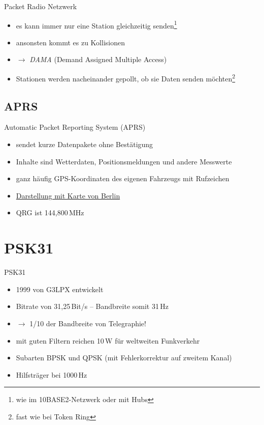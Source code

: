 \begin{frame}{Packet Radio Netzwerk}
  \begin{itemize}
    \item es kann immer nur eine Station gleichzeitig senden\footnote{wie im 10BASE2-Netzwerk oder mit Hubs}
    \item ansonsten kommt es zu Kollisionen
    \item $\rightarrow$ \emph{DAMA} (Demand Assigned Multiple Access)
    \item Stationen werden nacheinander gepollt, ob sie Daten senden möchten\footnote{fast wie bei Token Ring}
  \end{itemize}
\end{frame}

\subsection{APRS}
\begin{frame}{Automatic Packet Reporting System (APRS)}
  \begin{itemize}
    \item sendet kurze Datenpakete ohne Bestätigung
    \item Inhalte sind Wetterdaten, Positionsmeldungen und andere Messwerte
    \item ganz häufig GPS-Koordinaten des eigenen Fahrzeugs mit Rufzeichen
    \item \href{http://aprs.fi/\#!addr=berlin}{\ExternalLink Darstellung mit Karte von Berlin}
    \item QRG ist 144,800\,MHz
  \end{itemize}
\end{frame}

\section{PSK31}
\begin{frame}{PSK31}
  \begin{itemize}
    \item 1999 von G3LPX entwickelt
    \item Bitrate von 31,25\,Bit/s -- Bandbreite somit 31\,Hz
    \item $\rightarrow$ 1/10 der Bandbreite von Telegraphie!
    \item mit guten Filtern reichen 10\,W für weltweiten Funkverkehr
    \item Subarten BPSK und QPSK (mit Fehlerkorrektur auf zweitem Kanal)
    \item Hilfsträger bei 1000\,Hz
  \end{itemize}
\end{frame}

